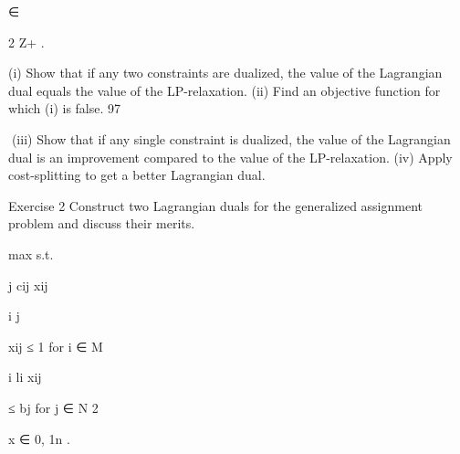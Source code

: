 \documentclass[titlepage]{book}
\theoremstyle{plain}
\theoremstyle{definition}
\theoremstyle{remark}
\begin{document}
∈

2
Z+
.

(i) Show that if any two constraints are dualized, the value of the Lagrangian dual equals the value of
the LP-relaxation.
(ii) Find an objective function for which (i) is false.
97

(iii) Show that if any single constraint is dualized, the value of the Lagrangian dual is an improvement
compared to the value of the LP-relaxation.
(iv) Apply cost-splitting to get a better Lagrangian dual.

Exercise 2
Construct two Lagrangian duals for the generalized assignment problem and discuss their merits.

max
s.t.

j cij xij

i
j

xij ≤ 1 for i ∈ M

i li xij

≤ bj for j ∈ N
2

x ∈ {0, 1}n .



\printindex
\glsaddall
{}
\printglossaries
\end{document}
